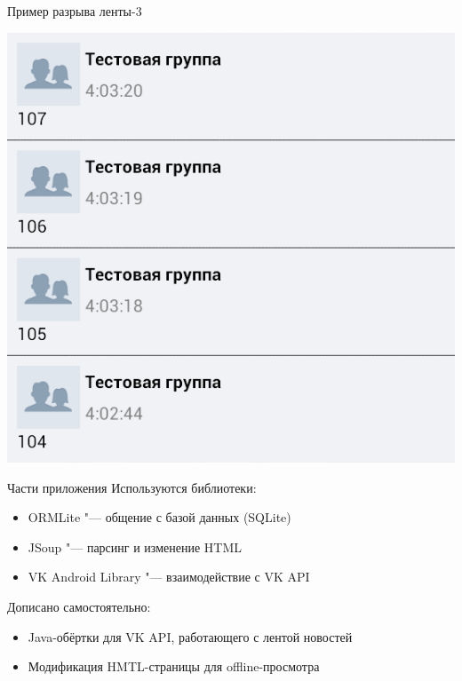 \documentclass[utf8,xcolor=table]{beamer}
\begin{document}
\begin{frame}[t]{Пример разрыва ленты-3}
	\begin{center}
		\includegraphics[scale=0.5]{c.png}
	\end{center}
\end{frame}

\begin{frame}[t]{Части приложения}
	Используются библиотеки:
	\begin{itemize}
		\item ORMLite "--- общение с базой данных (SQLite)
		\item JSoup "--- парсинг и изменение HTML
		\item VK Android Library "--- взаимодействие с VK API
	\end{itemize}
	Дописано самостоятельно:
	\begin{itemize}
		\item Java-обёртки для VK API, работающего с лентой новостей
		\item Модификация HMTL-страницы для offline-просмотра
	\end{itemize}
\end{frame}
\end{document}
